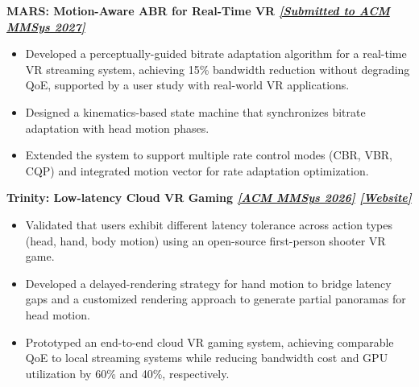\documentclass[10pt, letterpaper]{article}
\makeatletter
\newcommand{\roleentry}[3]{%
  \vspace{4pt}%
  \noindent
  \begin{tabularx}{\linewidth}{@{}X r@{}}
    \textbf{\color{darkgray}#1} & \textcolor{lightgray}{\small #3}
  \end{tabularx}\\[1pt]
  \noindent\textit{\color{midgray}\small #2}%
  \vspace{2pt}
}
\newcommand{\project}[1]{%
  \vspace{2pt}%
  \noindent\textbf{\color{navy}\small #1}%
  \vspace{1pt}
}
\makeatother
\begin{document}
\project{MARS: Motion-Aware ABR for Real-Time VR \hfill
  \normalfont\textit{\hyperlink{pub1}{\textcolor{linkblue}{[Submitted to ACM MMSys 2027]}}}}
\begin{itemize}
  \item Developed a perceptually-guided bitrate adaptation algorithm for a real-time VR streaming system, achieving 15\% bandwidth reduction without degrading QoE, supported by a user study with real-world VR applications.
  \item Designed a kinematics-based state machine that synchronizes bitrate adaptation with head motion phases.
  \item Extended the system to support multiple rate control modes (CBR, VBR, CQP) and integrated motion vector for rate adaptation optimization.
\end{itemize}

\project{Trinity: Low-latency Cloud VR Gaming \hfill
  \normalfont\textit{\hyperlink{pub3}{\textcolor{linkblue}{[ACM MMSys 2026]}}} \textit{\href{https://chutoutian.github.io/trinity.github.io/}{\textcolor{linkblue}{[Website]}}}}
\begin{itemize}
  \item Validated that users exhibit different latency tolerance across action types (head, hand, body motion) using an open-source first-person shooter VR game.
  \item Developed a delayed-rendering strategy for hand motion to bridge latency gaps and a customized rendering approach to generate partial panoramas for head motion.
  \item Prototyped an end-to-end cloud VR gaming system, achieving comparable QoE to local streaming systems while reducing bandwidth cost and GPU utilization by 60\% and 40\%, respectively.
\end{itemize}

\end{document}
